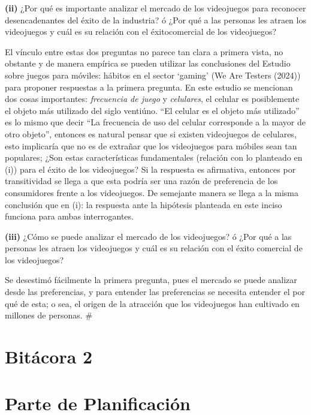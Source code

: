 \documentclass[
  letterpaper,
  DIV=11,
  numbers=noendperiod]{scrreprt}
\begin{document}
\textbf{(ii)} ¿Por qué es importante analizar el mercado de los
videojuegos para reconocer desencadenantes del éxito de la industria? ó
¿Por qué a las personas les atraen los videojuegos y cuál es su relación
con el éxitocomercial de los videojuegos?

El vínculo entre estas dos preguntas no parece tan clara a primera
vista, no obstante y de manera empírica se pueden utilizar las
conclusiones del Estudio sobre juegos para móviles: hábitos en el sector
`gaming' (We Are Testers (2024)) para proponer respuestas a la primera
pregunta. En este estudio se mencionan dos cosas importantes:
\emph{frecuencia de juego} y \emph{celulares}, el celular es
posiblemente el objeto más utilizado del siglo ventiúno. ``El celular es
el objeto más utilizado'' es lo mismo que decir ``La frecuencia de uso
del celular corresponde a la mayor de otro objeto'', entonces es natural
pensar que si existen videojuegos de celulares, esto implicaría que no
es de extrañar que los videojuegos para móbiles sean tan populares; ¿Son
estas características fundamentales (relación con lo planteado en (i))
para el éxito de los videojuegos? Si la respuesta es afirmativa,
entonces por transitividad se llega a que esta podría ser una razón de
preferencia de los consumidores frente a los videojuegos. De semejante
manera se llega a la misma conclusión que en (i): la respuesta ante la
hipótesis planteada en este inciso funciona para ambas interrogantes.

\textbf{(iii)} ¿Cómo se puede analizar el mercado de los videojuegos? ó
¿Por qué a las personas les atraen los videojuegos y cuál es su relación
con el éxito comercial de los videojuegos?

Se desestimó fácilmente la primera pregunta, pues el mercado se puede
analizar desde las preferencias, y para entender las preferencias se
necesita entender el por qué de esta; o sea, el origen de la atracción
que los videojuegos han cultivado en millones de personas. \#


\chapter{Bitácora 2}\label{bituxe1cora-2}


\chapter{Parte de Planificación}\label{parte-de-planificaciuxf3n}
\end{document}

